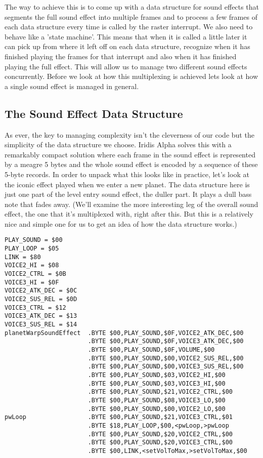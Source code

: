 The way to achieve this is to come up with a data structure for sound effects that segments the full sound effect
into multiple frames and to process a few frames of each data structure every time  is called
by the raster interrupt. We also need  to behave like a 'state machine'. This means that
when it is called a little later it can pick up from where it left off on each data structure, recognize
when it has finished playing the frames for that interrupt and also when it has finished playing the full effect. This
will allow us to manage two different sound effects concurrently. Before we look at how this multiplexing is achieved
lets look at how a single sound effect is managed in general.

\subsection{The Sound Effect Data Structure}
As ever, the key to managing complexity isn't the cleverness of our code but the simplicity of the data structure
we choose. Iridis Alpha solves this with a remarkably compact solution where each frame in the sound effect is represented
by a meagre 5 bytes and the whole sound effect is encoded by a sequence of these 5-byte records. In order to unpack
what this looks like in practice, let's look at the iconic effect played when we enter a new planet. The data structure
here is just one part of the level entry sound effect, the duller part. It plays a dull bass note that fades away. (We'll
examine the more interesting leg of the overall sound effect, the one that it's multiplexed with, right after this. But
this is a relatively nice and simple one for us to get an idea of how the data structure works.) 

\begin{lstlisting}
PLAY_SOUND = $00
PLAY_LOOP = $05
LINK = $80
VOICE2_HI = $08
VOICE2_CTRL = $0B
VOICE3_HI = $0F
VOICE2_ATK_DEC = $0C
VOICE2_SUS_REL = $0D
VOICE3_CTRL = $12
VOICE3_ATK_DEC = $13
VOICE3_SUS_REL = $14
planetWarpSoundEffect  .BYTE $00,PLAY_SOUND,$0F,VOICE2_ATK_DEC,$00
                       .BYTE $00,PLAY_SOUND,$0F,VOICE3_ATK_DEC,$00
                       .BYTE $00,PLAY_SOUND,$0F,VOLUME,$00
                       .BYTE $00,PLAY_SOUND,$00,VOICE2_SUS_REL,$00
                       .BYTE $00,PLAY_SOUND,$00,VOICE3_SUS_REL,$00
                       .BYTE $00,PLAY_SOUND,$03,VOICE2_HI,$00
                       .BYTE $00,PLAY_SOUND,$03,VOICE3_HI,$00
                       .BYTE $00,PLAY_SOUND,$21,VOICE2_CTRL,$00
                       .BYTE $00,PLAY_SOUND,$08,VOICE3_LO,$00
                       .BYTE $00,PLAY_SOUND,$00,VOICE2_LO,$00
pwLoop                 .BYTE $00,PLAY_SOUND,$21,VOICE3_CTRL,$01
                       .BYTE $18,PLAY_LOOP,$00,<pwLoop,>pwLoop
                       .BYTE $00,PLAY_SOUND,$20,VOICE2_CTRL,$00
                       .BYTE $00,PLAY_SOUND,$20,VOICE3_CTRL,$00
                       .BYTE $00,LINK,<setVolToMax,>setVolToMax,$00
\end{lstlisting}

